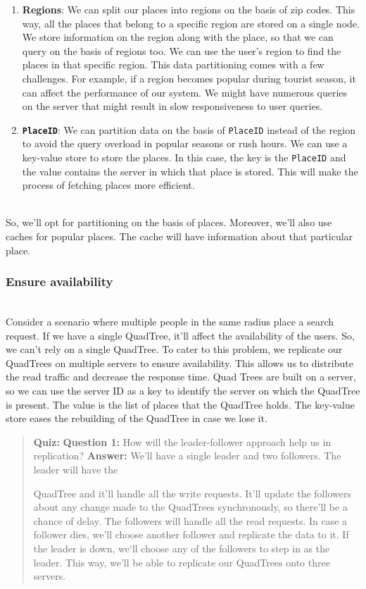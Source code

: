 \begin{enumerate}
\item
\protect{}\label{a1XhAiNMnUoLV6EPeTCZA}
\textbf{Regions}: We can split our places into regions on the basis of zip codes. This way, all the places that belong to a specific region are stored on a single node. We store information on the region along with the place, so that we can query on the basis of regions too. We can use the user's region to find the places in that specific region. This data partitioning comes with a few challenges. For example, if a region becomes popular during tourist season, it can affect the performance of our system. We might have numerous queries on the server that might result in slow responsiveness to user queries.
\item
\protect{}\label{ckD9mA_aBG_m07wsP68eB}
\textbf{\texttt{PlaceID}}: We can partition data on the basis of \texttt{PlaceID} instead of the region to avoid the query overload in popular seasons or rush hours. We can use a key-value store to store the places. In this case, the key is the \texttt{PlaceID} and the value contains the server in which that place is stored. This will make the process of fetching places more efficient.
\end{enumerate}
\\
So, we'll opt for partitioning on the basis of places. Moreover, we'll also use caches for popular places. The cache will have information about that particular place.

\subsubsection{Ensure availability}\label{WcU2fjjhwrPDTsgpUs14c}
\\
Consider a scenario where multiple people in the same radius place a search request. If we have a single QuadTree, it'll affect the availability of the users. So, we can't rely on a single QuadTree. To cater to this problem, we replicate our QuadTrees on multiple servers to ensure availability. This allows us to distribute the read traffic and decrease the response time. Quad Trees are built on a server, so we can use the server ID as a key to identify the server on which the QuadTree is present. The value is the list of places that the QuadTree holds. The key-value store eases the rebuilding of the QuadTree in case we lose it.

\begin{quote}
\textbf{Quiz:}
\textbf{Question 1:} How will the leader-follower approach help us in replication?
\textbf{Answer:} We'll have a single leader and two followers. The leader will have the

QuadTree and it'll handle all the write requests. It'll update the followers about any change made to the QuadTrees synchronously, so there'll be a chance of delay. The followers will handle all the read requests. In case a follower dies, we'll choose another follower and replicate the data to it. If the leader is down, we`ll choose any of the followers to step in as the leader. This way, we'll be able to replicate our QuadTrees onto three servers.
\end{quote}

